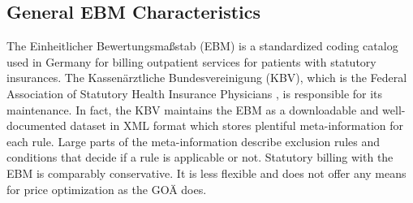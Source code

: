 \subsection{General EBM Characteristics}\label{subsec:general-ebm-characteristics}
The Einheitlicher Bewertungsmaßstab (EBM) is a standardized coding catalog used in Germany for billing outpatient services for patients with statutory insurances.
The Kassenärztliche Bundesvereinigung (KBV), which is the Federal Association of Statutory Health Insurance Physicians \cite[]{hermanns2015ebm}, is responsible for its maintenance.
In fact, the KBV maintains the EBM as a downloadable and well-documented dataset in XML format which stores plentiful meta-information for each rule.
Large parts of the meta-information describe exclusion rules and conditions that decide if a rule is applicable or not.
Statutory billing with the EBM is comparably conservative.
It is less flexible and does not offer any means for price optimization as the GOÄ does.


